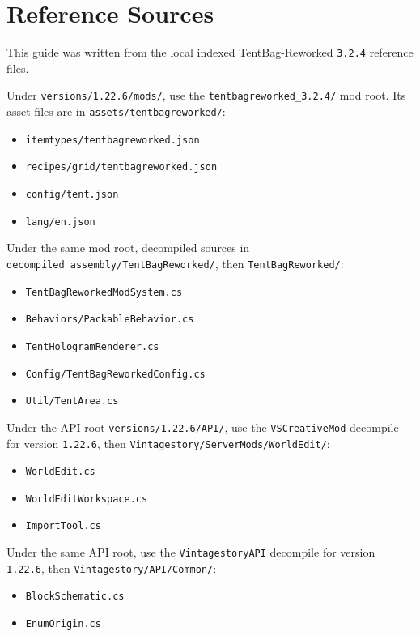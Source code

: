 \documentclass[
  11pt,
  letterpaper,
  titlepage]{article}
\providecommand{\tightlist}{%
  \setlength{\itemsep}{0pt}\setlength{\parskip}{0pt}}
\begin{document}
\section{Reference Sources}\label{reference-sources}

This guide was written from the local indexed TentBag-Reworked
\texttt{3.2.4} reference files.

Under \texttt{versions/1.22.6/mods/}, use the
\texttt{tentbagreworked\_3.2.4/} mod root. Its asset files are in
\texttt{assets/tentbagreworked/}:

\begin{itemize}
\tightlist
\item
  \texttt{itemtypes/tentbagreworked.json}
\item
  \texttt{recipes/grid/tentbagreworked.json}
\item
  \texttt{config/tent.json}
\item
  \texttt{lang/en.json}
\end{itemize}

Under the same mod root, decompiled sources in
\texttt{decompiled\ assembly/TentBagReworked/}, then
\texttt{TentBagReworked/}:

\begin{itemize}
\tightlist
\item
  \texttt{TentBagReworkedModSystem.cs}
\item
  \texttt{Behaviors/PackableBehavior.cs}
\item
  \texttt{TentHologramRenderer.cs}
\item
  \texttt{Config/TentBagReworkedConfig.cs}
\item
  \texttt{Util/TentArea.cs}
\end{itemize}

Under the API root \texttt{versions/1.22.6/API/}, use the
\texttt{VSCreativeMod} decompile for version \texttt{1.22.6}, then
\texttt{Vintagestory/ServerMods/WorldEdit/}:

\begin{itemize}
\tightlist
\item
  \texttt{WorldEdit.cs}
\item
  \texttt{WorldEditWorkspace.cs}
\item
  \texttt{ImportTool.cs}
\end{itemize}

Under the same API root, use the \texttt{VintagestoryAPI} decompile for
version \texttt{1.22.6}, then \texttt{Vintagestory/API/Common/}:

\begin{itemize}
\tightlist
\item
  \texttt{BlockSchematic.cs}
\item
  \texttt{EnumOrigin.cs}
\end{itemize}
\end{document}
